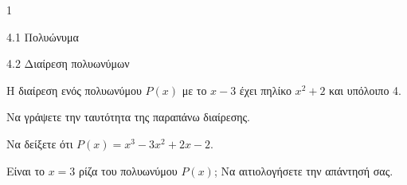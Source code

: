 \begin{ylh}{1}
\item 4.1 Πολυώνυμα
\item 4.2 Διαίρεση πολυωνύμων
\end{ylh}
Η διαίρεση ενός πολυωνύμου $P(x)$ με το $x - 3$ έχει πηλίκο $x^2 + 2$ και υπόλοιπο 4.
\begin{alist}
\item Να γράψετε την ταυτότητα της παραπάνω διαίρεσης.
\item Να δείξετε ότι $P(x) = x^3 - 3x^2 + 2x - 2$.
\item Είναι το $x = 3$ ρίζα του πολυωνύμου $P(x)$; Να αιτιολογήσετε την απάντησή σας.
\end{alist}

